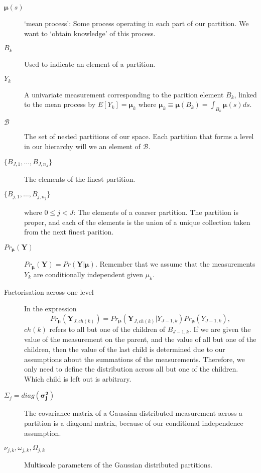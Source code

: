 \documentclass[a4paper,12pt]{article}
\theoremstyle{definition}
\begin{document}
\begin{description}
  \item[$\boldsymbol{\mu}(s)$] `mean process': Some process operating in each part of our partition. We want to `obtain knowledge' of this process.
  \item[$B_k$] Used to indicate an element of a partition.
  \item[$Y_k$] A univariate measurement corresponding to the parition element $B_k$, linked to the mean process by $E[Y_k] = \boldsymbol{\mu}_k$ where $\boldsymbol{\mu}_k \equiv \boldsymbol{\mu}(B_k) = \int_{B_k}\boldsymbol{\mu}(s)ds$.
	\item[$\mathscr{B}$] The set of nested partitions of our space. Each partition that forms a level in our hierarchy will we an element of $\mathscr{B}$.
  \item[$\lbrace B_{J,1}, \dots, B_{J,n_J} \rbrace$] The elements of the finest partition.
  \item[$\lbrace B_{j,1}, \dots, B_{j,n_j} \rbrace$] where $0 \leq j < J$: The elements of a coarser partition. The partition is proper, and each of the elements is the union of a unique collection taken from the next finest parition.
  \item[$Pr_{\boldsymbol{\mu}}(\mathbf{Y})$] $Pr_{\boldsymbol{\mu}}(\mathbf{Y}) = Pr(\mathbf{Y} | \boldsymbol{\mu})$. Remember that we assume that the measurements $Y_k$ are conditionally independent given $\mu_k$.
  \item[Factorisation across one level] In the expression
  \begin{equation}
  Pr_{\boldsymbol{\mu}}(\mathbf{Y}_{J,ch(k)}) = Pr_{\boldsymbol{\mu}}(\mathbf{Y}_{J,ch(k)} | Y_{J-1, k})Pr_{\boldsymbol{\mu}}(Y_{J-1,k}),
  \end{equation}
  $ch(k)$ refers to all but one of the children of $B_{J-1,k}$. If we are given the value of the measurement on the parent, and the value of all but one of the children, then the value of the last child is determined due to our assumptions about the summations of the measurements. Therefore, we only need to define the distribution across all but one of the children. Which child is left out is arbitrary.
  \item[$\Sigma_j = diag(\boldsymbol{\sigma^2_j})$] The covariance matrix of a Gaussian distributed measurement across a partition is a diagonal matrix, because of our conditional independence assumption.
  \item[$\nu_{j,k}, \omega_{j,k}, \Omega_{j,k}$] Multiscale parameters of the Gaussian distributed partitions.

\end{description}
\end{document}

